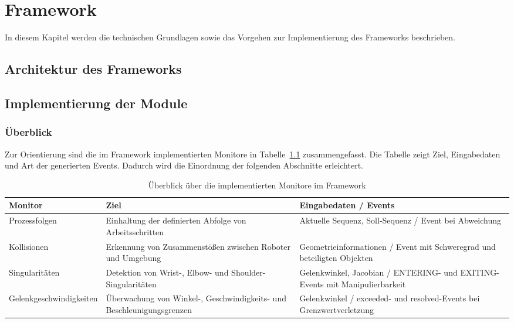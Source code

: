 \chapter{Framework}
\label{sec:framework}

In diesem Kapitel werden die technischen Grundlagen sowie das Vorgehen zur
Implementierung des Frameworks beschrieben.

\section{Architektur des Frameworks}
\label{sec:architektur_frameowork}


\section{Implementierung der Module}

\subsection*{Überblick}
Zur Orientierung sind die im Framework implementierten Monitore in
Tabelle~\ref{tab:monitor_overview_arch} zusammengefasst. Die Tabelle zeigt Ziel,
Eingabedaten und Art der generierten Events. Dadurch wird die Einordnung der
folgenden Abschnitte erleichtert.

\begin{table}[H]
  \centering
  \small
  \begin{tabularx}{\textwidth}{lXX}
    \toprule
    \textbf{Monitor}        & \textbf{Ziel}
    & \textbf{Eingabedaten / Events} \\
    \midrule
    Prozessfolgen           & Einhaltung der definierten Abfolge von
    Arbeitsschritten               &
    Aktuelle Sequenz, Soll-Sequenz / Event bei Abweichung
    \\
    \addlinespace
    Kollisionen             & Erkennung von Zusammenstößen zwischen
    Roboter und Umgebung            &
    Geometrieinformationen / Event mit Schweregrad und beteiligten
    Objekten                                                          \\
    \addlinespace
    Singularitäten          & Detektion von Wrist-, Elbow- und
    Shoulder-Singularitäten              &
    Gelenkwinkel, Jacobian / ENTERING- und EXITING-Events mit
    Manipulierbarkeit                                                      \\
    \addlinespace
    Gelenkgeschwindigkeiten & Überwachung von Winkel-,
    Geschwindigkeits- und Beschleunigungsgrenzen &
    Gelenkwinkel / exceeded- und resolved-Events bei
    Grenzwertverletzung
    \\
    \bottomrule
  \end{tabularx}
  \caption{Überblick über die implementierten Monitore im Framework}
  \label{tab:monitor_overview_arch}
\end{table}

